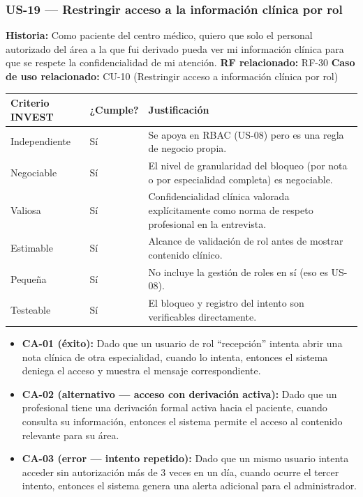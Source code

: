 \documentclass[11pt,a4paper]{article}
\providecommand{\tightlist}{%
	\setlength{\itemsep}{0pt}\setlength{\parskip}{0pt}}
\begin{document}
	\subsubsection{US-19 --- Restringir acceso a la información clínica por rol}
	
	\textbf{Historia:} Como paciente del centro médico, quiero que solo el personal autorizado del área a la que fui derivado pueda ver mi información clínica para que se respete la confidencialidad de mi atención.
	\textbf{RF relacionado:} RF-30
	\textbf{Caso de uso relacionado:} CU-10 (Restringir acceso a información clínica por rol)
	
	\begin{longtable}{p{} p{} p{}}
		
		
		\toprule
		\textbf{Criterio INVEST} &
		\textbf{¿Cumple?} &
		\textbf{Justificación} \\
		\midrule
		\endhead
		
		Independiente & Sí & Se apoya en RBAC (US-08) pero es una regla de negocio propia. \\
		Negociable & Sí & El nivel de granularidad del bloqueo (por nota o por especialidad completa) es negociable. \\
		Valiosa & Sí & Confidencialidad clínica valorada explícitamente como norma de respeto profesional en la entrevista. \\
		Estimable & Sí & Alcance de validación de rol antes de mostrar contenido clínico. \\
		Pequeña & Sí & No incluye la gestión de roles en sí (eso es US-08). \\
		Testeable & Sí & El bloqueo y registro del intento son verificables directamente. \\
		\bottomrule
	\end{longtable}
	
	\begin{itemize}
		\tightlist
		\item
		\textbf{CA-01 (éxito):} Dado que un usuario de rol ``recepción'' intenta abrir una nota clínica de otra especialidad, cuando lo intenta, entonces el sistema deniega el acceso y muestra el mensaje correspondiente.
		\item
		\textbf{CA-02 (alternativo --- acceso con derivación activa):} Dado que un profesional tiene una derivación formal activa hacia el paciente, cuando consulta su información, entonces el sistema permite el acceso al contenido relevante para su área.
		\item
		\textbf{CA-03 (error --- intento repetido):} Dado que un mismo usuario intenta acceder sin autorización más de 3 veces en un día, cuando ocurre el tercer intento, entonces el sistema genera una alerta adicional para el administrador.
	\end{itemize}
	
\end{document}
